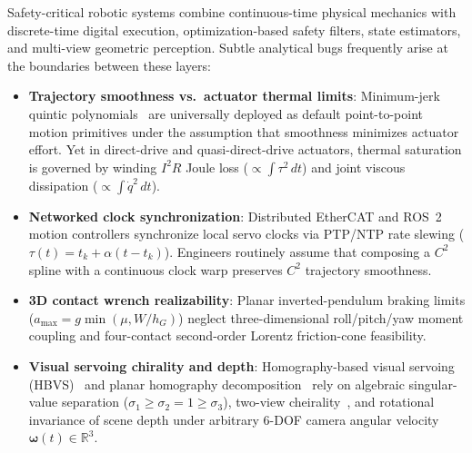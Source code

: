 \documentclass[10pt,twocolumn]{article}
\theoremstyle{definition}
\begin{document}
Safety-critical robotic systems combine continuous-time physical mechanics with discrete-time digital execution, optimization-based safety filters, state estimators, and multi-view geometric perception. Subtle analytical bugs frequently arise at the boundaries between these layers:
\begin{itemize}[leftmargin=1.4em,itemsep=2pt]
  \item \textbf{Trajectory smoothness vs.\ actuator thermal limits}: Minimum-jerk quintic polynomials~\cite{FlashHogan1985} are universally deployed as default point-to-point motion primitives under the assumption that smoothness minimizes actuator effort. Yet in direct-drive and quasi-direct-drive actuators, thermal saturation is governed by winding $I^2R$ Joule loss ($\propto \int \tau^2\,dt$) and joint viscous dissipation ($\propto \int \dot{q}^2\,dt$).
  \item \textbf{Networked clock synchronization}: Distributed EtherCAT and ROS~2 motion controllers synchronize local servo clocks via PTP/NTP rate slewing ($\tau(t) = t_k + \alpha (t - t_k)$). Engineers routinely assume that composing a $C^2$ spline with a continuous clock warp preserves $C^2$ trajectory smoothness.
  \item \textbf{3D contact wrench realizability}: Planar inverted-pendulum braking limits ($a_{\max} = g\min(\mu, W/h_G)$) neglect three-dimensional roll/pitch/yaw moment coupling and four-contact second-order Lorentz friction-cone feasibility.
  \item \textbf{Visual servoing chirality and depth}: Homography-based visual servoing (HBVS)~\cite{MalisChaumette2000} and planar homography decomposition~\cite{FaugerasLustman1988} rely on algebraic singular-value separation ($\sigma_1 \ge \sigma_2 = 1 \ge \sigma_3$), two-view cheirality~\cite{HartleyZisserman2004}, and rotational invariance of scene depth under arbitrary 6-DOF camera angular velocity $\boldsymbol{\omega}(t) \in \mathbb{R}^3$.
\end{itemize}
\end{document}
